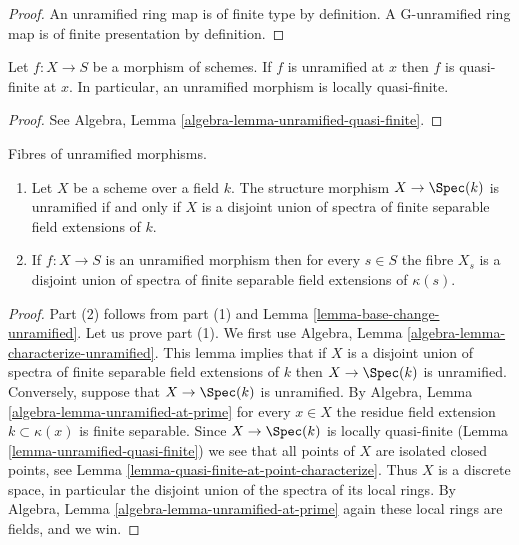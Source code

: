 \begin{proof}
An unramified ring map is of finite type by definition.
A G-unramified ring map is of finite presentation by definition.
\end{proof}

\begin{lemma}
\label{lemma-unramified-quasi-finite}
Let $f : X \to S$ be a morphism of schemes.
If $f$ is unramified at $x$ then $f$ is quasi-finite at $x$.
In particular, an unramified morphism is locally quasi-finite.
\end{lemma}

\begin{proof}
See Algebra, Lemma \ref{algebra-lemma-unramified-quasi-finite}.
\end{proof}

\begin{lemma}
\label{lemma-unramified-over-field}
Fibres of unramified morphisms.
\begin{enumerate}
\item Let $X$ be a scheme over a field $k$.
The structure morphism $X \to \Spec(k)$ is unramified if
and only if $X$ is a disjoint union of spectra of finite separable
field extensions of $k$.
\item If $f : X \to S$ is an unramified morphism then for every $s \in S$
the fibre $X_s$ is a disjoint union of spectra of finite separable field
extensions of $\kappa(s)$.
\end{enumerate}
\end{lemma}

\begin{proof}
Part (2) follows from part (1) and
Lemma \ref{lemma-base-change-unramified}.
Let us prove part (1).
We first use Algebra, Lemma \ref{algebra-lemma-characterize-unramified}.
This lemma implies that if $X$ is a disjoint union of spectra of finite
separable field extensions of $k$ then $X \to \Spec(k)$ is unramified.
Conversely, suppose that $X \to \Spec(k)$ is unramified.
By Algebra, Lemma \ref{algebra-lemma-unramified-at-prime} for every $x \in X$
the residue field extension $k \subset \kappa(x)$ is
finite separable. Since $X \to \Spec(k)$ is locally
quasi-finite (Lemma \ref{lemma-unramified-quasi-finite})
we see that all points of $X$ are isolated closed points, see
Lemma \ref{lemma-quasi-finite-at-point-characterize}.
Thus $X$ is a discrete space, in particular the disjoint union
of the spectra of its local rings. By
Algebra, Lemma \ref{algebra-lemma-unramified-at-prime} again these
local rings are fields, and we win.
\end{proof}

